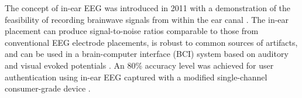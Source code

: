 \documentclass{sigchi}
\begin{document}



The concept of in-ear EEG was introduced in 2011 with a demonstration of the feasibility of recording brainwave signals from within the ear canal \cite{Looney2011}. The in-ear placement can produce signal-to-noise ratios comparable to those from conventional EEG electrode placements, is robust to common sources of artifacts, and can be used in a brain-computer interface (BCI) system based on auditory and visual evoked potentials \cite{Kidmose2013a}. An 80\% accuracy level was achieved for user authentication using in-ear EEG captured with a modified single-channel consumer-grade device \cite{curran2016passthoughts}.
\end{document}
